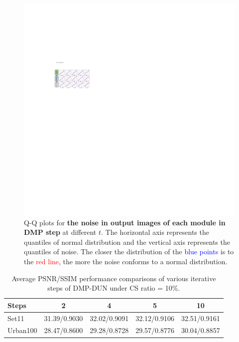 \documentclass[10pt,twocolumn,letterpaper]{article}
\begin{document}
\begin{figure}[t]
	\centering
	\includegraphics[width=\linewidth]{QQ_Plot.pdf}
	\caption{Q-Q plots for \textbf{the noise in output images of each module in DMP step} at different $t$. The horizontal axis represents the quantiles of normal distribution and the vertical axis represents the quantiles of noise. The closer the distribution of the \textcolor{blue}{blue points} is to the \textcolor{red}{red line}, the more the noise conforms to a normal distribution.}
	\label{fig:qq_plot}
\end{figure}

\begin{table}[t]
	\centering
	\begin{adjustbox}{width=1.0\columnwidth,center}
		\begin{tabular}{@{}lcccc@{}}
			\toprule
			Steps & 2 & 4 & 5 & 10 \\ \midrule
			Set11 & 31.39/0.9030 & 32.02/0.9091 & 32.12/0.9106 & 32.51/0.9161 \\
			Urban100 & 28.47/0.8600 & 29.28/0.8728 & 29.57/0.8776 & 30.04/0.8857 \\ \bottomrule
		\end{tabular}
	\end{adjustbox}
	\caption{Average PSNR/SSIM performance comparisons of various iterative steps of DMP-DUN under CS ratio = 10\%.}
	\label{table:iterative_steps}
\end{table}
\end{document}
